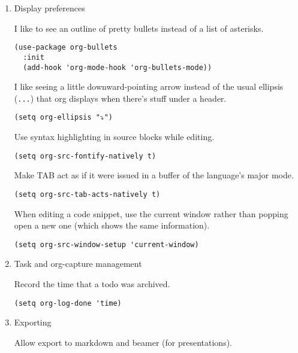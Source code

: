 \documentclass{article}
\begin{document}
\begin{enumerate}
\item Display preferences
\label{sec:org457e5d7}

I like to see an outline of pretty bullets instead of a list of asterisks.

\begin{verbatim}
(use-package org-bullets
  :init
  (add-hook 'org-mode-hook 'org-bullets-mode))
\end{verbatim}

I like seeing a little downward-pointing arrow instead of the usual ellipsis
(\texttt{...}) that org displays when there's stuff under a header.

\begin{verbatim}
(setq org-ellipsis "⤵")
\end{verbatim}

Use syntax highlighting in source blocks while editing.

\begin{verbatim}
(setq org-src-fontify-natively t)
\end{verbatim}

Make TAB act as if it were issued in a buffer of the language's major mode.

\begin{verbatim}
(setq org-src-tab-acts-natively t)
\end{verbatim}

When editing a code snippet, use the current window rather than popping open a
new one (which shows the same information).

\begin{verbatim}
(setq org-src-window-setup 'current-window)
\end{verbatim}



\item Task and org-capture management
\label{sec:org9b60fd8}

Record the time that a todo was archived.

\begin{verbatim}
(setq org-log-done 'time)
\end{verbatim}



\item Exporting
\label{sec:orgc83fa56}

Allow export to markdown and beamer (for presentations).


\end{enumerate}
\end{document}
